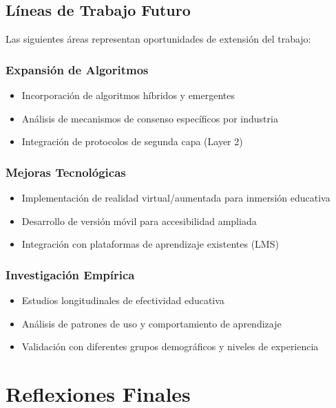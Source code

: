 \documentclass[spanish,12pt,letterpaper]{report}
\begin{document}
\subsection{Líneas de Trabajo Futuro}

Las siguientes áreas representan oportunidades de extensión del trabajo:

\subsubsection{Expansión de Algoritmos}

\begin{itemize}
    \item Incorporación de algoritmos híbridos y emergentes
    \item Análisis de mecanismos de consenso específicos por industria
    \item Integración de protocolos de segunda capa (Layer 2)
\end{itemize}

\subsubsection{Mejoras Tecnológicas}

\begin{itemize}
    \item Implementación de realidad virtual/aumentada para inmersión educativa
    \item Desarrollo de versión móvil para accesibilidad ampliada
    \item Integración con plataformas de aprendizaje existentes (LMS)
\end{itemize}

\subsubsection{Investigación Empírica}

\begin{itemize}
    \item Estudios longitudinales de efectividad educativa
    \item Análisis de patrones de uso y comportamiento de aprendizaje
    \item Validación con diferentes grupos demográficos y niveles de experiencia
\end{itemize}

\section{Reflexiones Finales}
\end{document}
